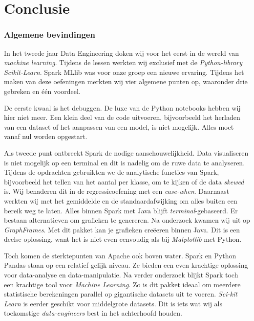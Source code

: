 \documentclass[a4paper,10pt,twoside]{report}
\begin{document}
\chapter{Conclusie}

\subsection*{Algemene bevindingen}

In het tweede jaar Data Engineering doken wij voor het eerst in de wereld van \textit{machine learning}. Tijdens de lessen werkten wij exclusief met de \textit{Python-library Scikit-Learn}. Spark MLlib was voor onze groep een nieuwe ervaring. Tijdens het maken van deze oefeningen merkten wij vier algemene punten op, waaronder drie gebreken en één voordeel.

De eerste kwaal is het debuggen. De luxe van de Python notebooks hebben wij hier niet meer. Een klein deel van de code uitvoeren, bijvoorbeeld het herladen van een dataset of het aanpassen van een model, is niet mogelijk. Alles moet vanaf nul worden opgestart. 

Als tweede punt ontbreekt Spark de nodige aanschouwelijkheid. Data visualiseren is niet mogelijk op een terminal en dit is nadelig om de ruwe data te analyseren. Tijdens de opdrachten gebruikten we de analytische functies van Spark, bijvoorbeeld het tellen van het aantal per klasse, om te kijken of de data \textit{skewed} is. Wij benaderen dit in de regressieoefening met een \textit{case-when}.  Daarnaast werkten wij met het gemiddelde en de standaardafwijking om alles buiten een bereik weg te laten. Alles binnen Spark met Java blijft \textit{terminal}-gebaseerd. Er bestaan alternatieven om grafieken te genereren. Na onderzoek kwamen wij uit op \textit{GraphFrames}. Met dit pakket kan je grafieken creëeren binnen Java. Dit is een deelse oplossing, want het is niet even eenvoudig als bij \textit{Matplotlib} met Python.

Toch komen de sterktepunten van Apache ook boven water. Spark en Python Pandas staan op een relatief gelijk niveau. Ze bieden een even krachtige oplossing voor data-analyse en data-manipulatie. Na verder onderzoek blijkt Spark toch een krachtige tool voor \textit{Machine Learning}. Zo is dit pakket ideaal om meerdere statistische berekeningen parallel op gigantische datasets uit te voeren. \textit{Sci-kit Learn} is eerder geschikt voor middelgrote datasets. Dit is iets wat wij als toekomstige \textit{data-engineers} best in het achterhoofd houden.
\end{document}
